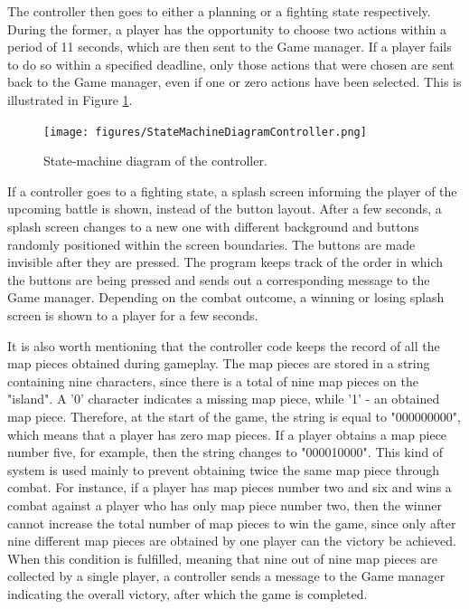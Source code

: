 The controller then goes to either a planning or a fighting state respectively. During the former, a player has the opportunity to choose two actions within a period of 11 seconds, which are then sent to the Game manager. If a player fails to do so within a specified deadline, only those actions that were chosen are sent back to the Game manager, even if one or zero actions have been selected. This is illustrated in Figure \ref{fig:stateMachine}.

\begin{figure}
	\centering
	\texttt{[image: figures/StateMachineDiagramController.png]}
	\caption{State-machine diagram of the controller. \label{fig:stateMachine}}
\end{figure}

If a controller goes to a fighting state, a splash screen informing the player of the upcoming battle is shown, instead of the button layout. After a few seconds, a splash screen changes to a new one with different background and buttons randomly positioned within the screen boundaries. The buttons are made invisible after they are pressed. The program keeps track of the order in which the buttons are being pressed and sends out a corresponding message to the Game manager. Depending on the combat outcome, a winning or losing splash screen is shown to a player for a few seconds. 

It is also worth mentioning that the controller code keeps the record of all the map pieces obtained during gameplay. The map pieces are stored in a string containing nine characters, since there is a total of nine map pieces on the "island". A '0' character indicates a missing map piece, while '1' - an obtained map piece. Therefore, at the start of the game, the string is equal to "000000000", which means that a player has zero map pieces. If a player obtains a map piece number five, for example, then the string changes to "000010000". This kind of system is used mainly to prevent obtaining twice the same map piece through combat. For instance, if a player has map pieces number two and six and wins a combat against a player who has only map piece number two, then the winner cannot increase the total number of map pieces to win the game, since only after nine different map pieces are obtained by one player can the victory be achieved. When this condition is fulfilled, meaning that nine out of nine map pieces are collected by a single player, a controller sends a message to the Game manager indicating the overall victory, after which the game is completed. 

